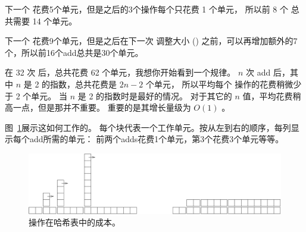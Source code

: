 
下一个  花费5个单元，但是之后的3个操作每个只花费 1 个单元，
所以前 8 个  总共需要 14 个单元。


下一个  花费9个单元，但是之后在下一次 调整大小 ()
之前，可以再增加额外的7个，所以前16个add总共是30个单元。


在 32 次  后，总共花费 62 个单元，我想你开始看到一个规律。
$n$ 次 add 后，其中 $n$ 是 2 的指数，总共花费是 $2n-2$ 个单元，
所以平均每个  操作的花费稍微少于 2 个单元。
当 $n$ 是 2 的指数时是最好的情况。
对于其它的 $n$ 值，平均花费稍高一点，但是那并不重要。
重要的是其增长量级为 $O(1)$ 。


图~\ref{fig.hash}展示这如何工作的。
每个块代表一个工作单元。按从左到右的顺序，每列显示每个add所需的单元：
前两个adds花费1个单元，第3个花费3个单元等等。

\begin{figure}
\centerline{\includegraphics[width=5.5in]{../source/figs/towers.pdf}}
\caption{  操作在哈希表中的成本。 \label{fig.hash}}
\end{figure}

